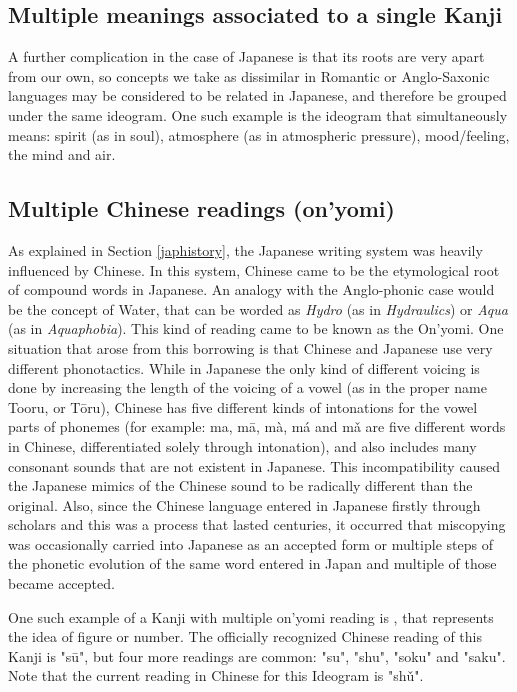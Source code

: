 \subsection{Multiple meanings associated to a single Kanji}
A further complication in the case of Japanese is that its roots are very apart from our own, so concepts we take as dissimilar in Romantic or Anglo-Saxonic languages may be considered to be related in Japanese, and therefore be grouped under the same ideogram. One such example is the ideogram  that simultaneously means: spirit (as in soul), atmosphere (as in atmospheric pressure), mood/feeling, the mind and air.

\subsection{Multiple Chinese readings (on'yomi)}

As explained in Section \ref{japhistory}, the Japanese writing system was heavily influenced by Chinese. In this system, Chinese came to be the etymological root of compound words in Japanese. An analogy with the Anglo-phonic case would be the concept of Water, that can be worded as \textit{Hydro} (as in \textit{Hydraulics}) or \textit{Aqua} (as in \textit{Aquaphobia}). This kind of reading came to be known as the On'yomi. One situation that arose from this borrowing is that Chinese and Japanese use very different phonotactics. While in Japanese the only kind of different voicing is done by increasing the length of the voicing of a vowel (as in the proper name Tooru, or T\={o}ru), Chinese has five different kinds of intonations for the vowel parts of phonemes (for example: ma, m\={a}, m\`{a}, m\'{a} and m\v{a} are five different words in Chinese, differentiated solely through intonation), and also includes many consonant sounds that are not existent in Japanese. This incompatibility caused the Japanese mimics of the Chinese sound to be radically different than the original. Also, since the Chinese language entered in Japanese firstly through scholars and this was a process that lasted centuries, it occurred that miscopying was occasionally carried into Japanese as an accepted form or multiple steps of the phonetic evolution of the same word entered in Japan and multiple of those became accepted.

One such example of a Kanji with multiple on'yomi reading is , that represents the idea of figure or number. The officially recognized Chinese reading of this Kanji is "s\={u}", but four more readings are common: "su", "shu", "soku" and "saku". Note that the current reading in Chinese for this Ideogram is "sh\v{u}".

